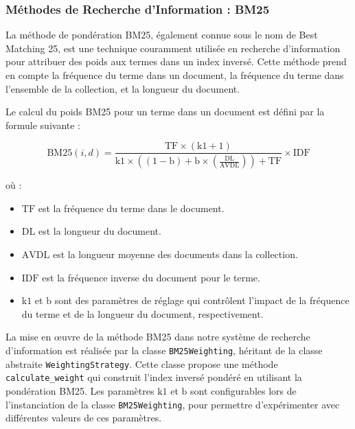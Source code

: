 \documentclass[a4paper, 12pt]{article}
\begin{document}
\newpage


\newpage

\subsubsection{Méthodes de Recherche d'Information : BM25}

La méthode de pondération BM25, également connue sous le nom de Best Matching 25,
est une technique couramment utilisée en recherche d'information pour attribuer des poids aux termes dans un index inversé.
Cette méthode prend en compte la fréquence du terme dans un document, la fréquence du terme dans l'ensemble de la collection,
et la longueur du document.

Le calcul du poids BM25 pour un terme dans un document est défini par la formule suivante :

\begin{equation}
\text{BM25}(i, d) = \frac{{\text{TF} \times (\text{k1} + 1)}}{{\text{k1} \times \left((1 - \text{b}) + \text{b} \times \left(\frac{\text{DL}}{\text{AVDL}}\right)\right) + \text{TF}}} \times \text{IDF}
\end{equation}

où :
\begin{itemize}
    \item $\text{TF}$ est la fréquence du terme dans le document.
    \item $\text{DL}$ est la longueur du document.
    \item $\text{AVDL}$ est la longueur moyenne des documents dans la collection.
    \item $\text{IDF}$ est la fréquence inverse du document pour le terme.
    \item $\text{k1}$ et $\text{b}$ sont des paramètres de réglage qui contrôlent l'impact de la fréquence du terme et de la longueur du document, respectivement. \\
\end{itemize}

La mise en œuvre de la méthode BM25 dans notre système de recherche d'information est réalisée par la  classe \texttt{BM25Weighting}, héritant de la classe abstraite \texttt{WeightingStrategy}. Cette classe propose une méthode \texttt{calculate\_weight} 
qui construit l'index inversé pondéré en utilisant la pondération BM25. 
Les paramètres $\text{k1}$ et $\text{b}$ sont configurables lors de l'instanciation de la classe \texttt{BM25Weighting}, pour permettre d'expérimenter avec différentes valeurs de ces paramètres.
\end{document}
